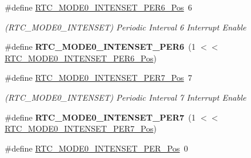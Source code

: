 \begin{DoxyCompactItemize}
\item 
\hypertarget{group___s_a_m_l21___r_t_c_ga1586292326439813282a9c5452820473}{}\#define \hyperlink{group___s_a_m_l21___r_t_c_ga1586292326439813282a9c5452820473}{R\+T\+C\+\_\+\+M\+O\+D\+E0\+\_\+\+I\+N\+T\+E\+N\+S\+E\+T\+\_\+\+P\+E\+R6\+\_\+\+Pos}~6\label{group___s_a_m_l21___r_t_c_ga1586292326439813282a9c5452820473}

\begin{DoxyCompactList}\small\item\em (R\+T\+C\+\_\+\+M\+O\+D\+E0\+\_\+\+I\+N\+T\+E\+N\+S\+E\+T) Periodic Interval 6 Interrupt Enable \end{DoxyCompactList}\item 
\hypertarget{group___s_a_m_l21___r_t_c_gad5d8384d168bc5bebe4355517728c872}{}\#define {\bfseries R\+T\+C\+\_\+\+M\+O\+D\+E0\+\_\+\+I\+N\+T\+E\+N\+S\+E\+T\+\_\+\+P\+E\+R6}~(1 $<$$<$ \hyperlink{group___s_a_m_l21___r_t_c_ga1586292326439813282a9c5452820473}{R\+T\+C\+\_\+\+M\+O\+D\+E0\+\_\+\+I\+N\+T\+E\+N\+S\+E\+T\+\_\+\+P\+E\+R6\+\_\+\+Pos})\label{group___s_a_m_l21___r_t_c_gad5d8384d168bc5bebe4355517728c872}

\item 
\hypertarget{group___s_a_m_l21___r_t_c_gace8f0c763f401d40a767b153ad1d241e}{}\#define \hyperlink{group___s_a_m_l21___r_t_c_gace8f0c763f401d40a767b153ad1d241e}{R\+T\+C\+\_\+\+M\+O\+D\+E0\+\_\+\+I\+N\+T\+E\+N\+S\+E\+T\+\_\+\+P\+E\+R7\+\_\+\+Pos}~7\label{group___s_a_m_l21___r_t_c_gace8f0c763f401d40a767b153ad1d241e}

\begin{DoxyCompactList}\small\item\em (R\+T\+C\+\_\+\+M\+O\+D\+E0\+\_\+\+I\+N\+T\+E\+N\+S\+E\+T) Periodic Interval 7 Interrupt Enable \end{DoxyCompactList}\item 
\hypertarget{group___s_a_m_l21___r_t_c_ga6b218a1fbd7710599e0c857243a45c84}{}\#define {\bfseries R\+T\+C\+\_\+\+M\+O\+D\+E0\+\_\+\+I\+N\+T\+E\+N\+S\+E\+T\+\_\+\+P\+E\+R7}~(1 $<$$<$ \hyperlink{group___s_a_m_l21___r_t_c_gace8f0c763f401d40a767b153ad1d241e}{R\+T\+C\+\_\+\+M\+O\+D\+E0\+\_\+\+I\+N\+T\+E\+N\+S\+E\+T\+\_\+\+P\+E\+R7\+\_\+\+Pos})\label{group___s_a_m_l21___r_t_c_ga6b218a1fbd7710599e0c857243a45c84}

\item 
\hypertarget{group___s_a_m_l21___r_t_c_ga0beab8f00a957ca0996fc7ed055421b4}{}\#define \hyperlink{group___s_a_m_l21___r_t_c_ga0beab8f00a957ca0996fc7ed055421b4}{R\+T\+C\+\_\+\+M\+O\+D\+E0\+\_\+\+I\+N\+T\+E\+N\+S\+E\+T\+\_\+\+P\+E\+R\+\_\+\+Pos}~0\label{group___s_a_m_l21___r_t_c_ga0beab8f00a957ca0996fc7ed055421b4}


\end{DoxyCompactItemize}
